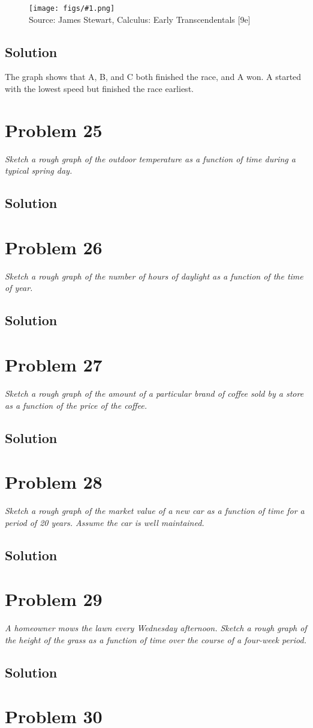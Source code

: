 \documentclass[11pt]{article}
\newcommand{\soln}{\subsection*}
\newcommand{\qn}{\textit}
\newcommand{\imagesource}[1]{{\footnotesize Source: #1}}
\newcommand{\imgqn}[1]{
	\begin{figure}[H]
		\centering
		\texttt{[image: figs/\#1.png]}\\
		\imagesource{James Stewart, Calculus: Early Transcendentals [9e]}
	\end{figure}
}
\begin{document}
\imgqn{1.1.24}

\soln{Solution}
The graph shows that A, B, and C both finished the race, and A won. A started with the lowest speed but finished the race earliest.

\section*{Problem 25}

\qn{Sketch a rough graph of the outdoor temperature as a function of time during a typical spring day.}

\soln{Solution}

\section*{Problem 26}

\qn{Sketch a rough graph of the number of hours of daylight as a function of the time of year.}

\soln{Solution}

\section*{Problem 27}

\qn{Sketch a rough graph of the amount of a particular brand of coffee sold by a store as a function of the price of the coffee.}

\soln{Solution}

\section*{Problem 28}

\qn{Sketch a rough graph of the market value of a new car as a function of time for a period of 20 years. Assume the car is well maintained.}

\soln{Solution}

\section*{Problem 29}

\qn{A homeowner mows the lawn every Wednesday afternoon. Sketch a rough graph of the height of the grass as a function of time over the course of a four-week period.}

\soln{Solution}

\section*{Problem 30}
\end{document}
